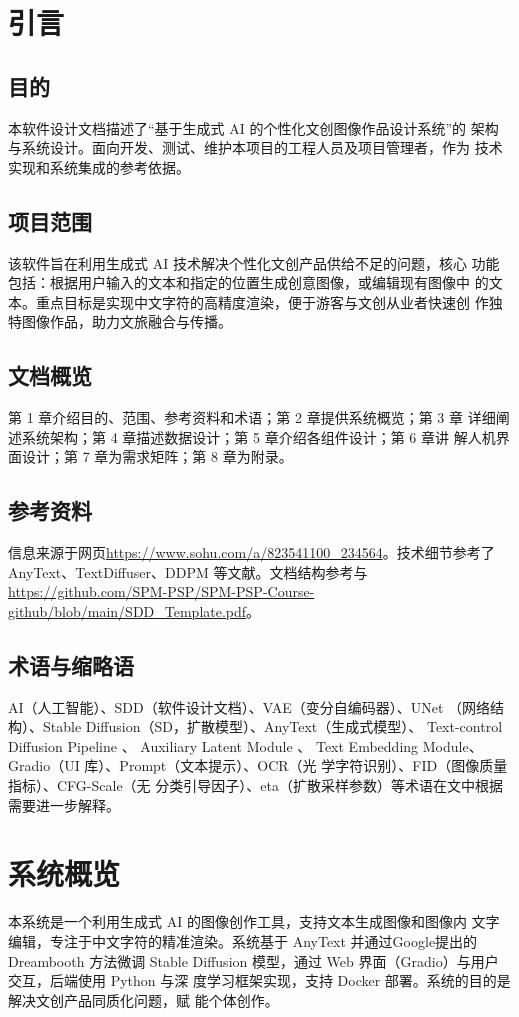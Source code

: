 \documentclass[a4paper,12pt]{ctexart}  %
\begin{document}

\makecover

\tableofcontents
\clearpage

\section{引言}
\subsection{目的}
本软件设计文档描述了“基于生成式 AI 的个性化文创图像作品设计系统”的
架构与系统设计。面向开发、测试、维护本项目的工程人员及项目管理者，作为
技术实现和系统集成的参考依据。
\subsection{项目范围}
该软件旨在利用生成式 AI 技术解决个性化文创产品供给不足的问题，核心
功能包括：根据用户输入的文本和指定的位置生成创意图像，或编辑现有图像中
的文本。重点目标是实现中文字符的高精度渲染，便于游客与文创从业者快速创
作独特图像作品，助力文旅融合与传播。
\subsection{文档概览}
第 1 章介绍目的、范围、参考资料和术语；第 2 章提供系统概览；第 3 章
详细阐述系统架构；第 4 章描述数据设计；第 5 章介绍各组件设计；第 6 章讲
解人机界面设计；第 7 章为需求矩阵；第 8 章为附录。
\subsection{参考资料}
信息来源于网页\url{https://www.sohu.com/a/823541100_234564}。技术细节参考了
AnyText、TextDiffuser、DDPM 等文献。文档结构参考与\url{https://github.com/SPM-PSP/SPM-PSP-Course-github/blob/main/SDD_Template.pdf}。
\subsection{术语与缩略语}
AI（人工智能）、SDD（软件设计文档）、VAE（变分自编码器）、UNet
（网络结构）、Stable Diffusion（SD，扩散模型）、AnyText（生成式模型）、
Text-control Diffusion Pipeline 、 Auxiliary Latent Module 、 Text Embedding
Module、Gradio（UI 库）、Prompt（文本提示）、OCR（光
学字符识别）、FID（图像质量指标）、CFG-Scale（无
分类引导因子）、eta（扩散采样参数）等术语在文中根据需要进一步解释。

\section{系统概览}
本系统是一个利用生成式 AI 的图像创作工具，支持文本生成图像和图像内
文字编辑，专注于中文字符的精准渲染。系统基于 AnyText 并通过Google提出的Dreambooth
方法微调 Stable
Diffusion 模型，通过 Web 界面（Gradio）与用户交互，后端使用 Python 与深
度学习框架实现，支持 Docker 部署。系统的目的是解决文创产品同质化问题，赋
能个体创作。
\end{document}
